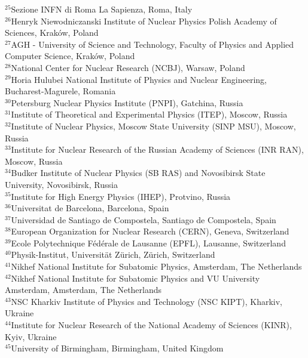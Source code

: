 \documentclass[12pt,a4paper]{article}
\begin{document}
\begin{flushleft}
{$ ^{25}$Sezione INFN di Roma La Sapienza, Roma, Italy\\
$ ^{26}$Henryk Niewodniczanski Institute of Nuclear Physics  Polish Academy of Sciences, Krak\'{o}w, Poland\\
$ ^{27}$AGH - University of Science and Technology, Faculty of Physics and Applied Computer Science, Krak\'{o}w, Poland\\
$ ^{28}$National Center for Nuclear Research (NCBJ), Warsaw, Poland\\
$ ^{29}$Horia Hulubei National Institute of Physics and Nuclear Engineering, Bucharest-Magurele, Romania\\
$ ^{30}$Petersburg Nuclear Physics Institute (PNPI), Gatchina, Russia\\
$ ^{31}$Institute of Theoretical and Experimental Physics (ITEP), Moscow, Russia\\
$ ^{32}$Institute of Nuclear Physics, Moscow State University (SINP MSU), Moscow, Russia\\
$ ^{33}$Institute for Nuclear Research of the Russian Academy of Sciences (INR RAN), Moscow, Russia\\
$ ^{34}$Budker Institute of Nuclear Physics (SB RAS) and Novosibirsk State University, Novosibirsk, Russia\\
$ ^{35}$Institute for High Energy Physics (IHEP), Protvino, Russia\\
$ ^{36}$Universitat de Barcelona, Barcelona, Spain\\
$ ^{37}$Universidad de Santiago de Compostela, Santiago de Compostela, Spain\\
$ ^{38}$European Organization for Nuclear Research (CERN), Geneva, Switzerland\\
$ ^{39}$Ecole Polytechnique F\'{e}d\'{e}rale de Lausanne (EPFL), Lausanne, Switzerland\\
$ ^{40}$Physik-Institut, Universit\"{a}t Z\"{u}rich, Z\"{u}rich, Switzerland\\
$ ^{41}$Nikhef National Institute for Subatomic Physics, Amsterdam, The Netherlands\\
$ ^{42}$Nikhef National Institute for Subatomic Physics and VU University Amsterdam, Amsterdam, The Netherlands\\
$ ^{43}$NSC Kharkiv Institute of Physics and Technology (NSC KIPT), Kharkiv, Ukraine\\
$ ^{44}$Institute for Nuclear Research of the National Academy of Sciences (KINR), Kyiv, Ukraine\\
$ ^{45}$University of Birmingham, Birmingham, United Kingdom\\
}
\end{flushleft}
\end{document}
